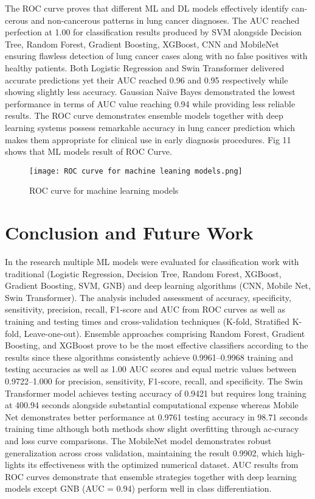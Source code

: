 \documentclass[runningheads]{llncs}
\begin{document}
The ROC curve proves that different ML and DL models effectively identify can-cerous and non-cancerous patterns in lung cancer diagnoses. The AUC reached perfection at 1.00 for classification results produced by SVM alongside Decision Tree, Random Forest, Gradient Boosting, XGBoost, CNN and MobileNet ensuring flawless detection of lung cancer cases along with no false positives with healthy patients. Both Logistic Regression and Swin Transformer delivered accurate predictions yet their AUC reached 0.96 and 0.95 respectively while showing slightly less accuracy. Gaussian Naïve Bayes demonstrated the lowest performance in terms of AUC value reaching 0.94 while providing less reliable results. The ROC curve demonstrates ensemble models together with deep learning systems possess remarkable accuracy in lung cancer prediction which makes them appropriate for clinical use in early diagnosis procedures. Fig 11 shows that ML models result of ROC Curve. 

\begin{figure}
    \centering
    \texttt{[image: ROC curve for machine leaning models.png]}
    \caption{ROC curve for machine learning models}
    \label{fig:enter-label}
\end{figure}


\section{Conclusion and Future Work}

In the research multiple ML models were evaluated for classification work with traditional (Logistic Regression, Decision Tree, Random Forest, XGBoost, Gradient Boosting, SVM, GNB) and deep learning algorithms (CNN, Mobile Net, Swin Transformer). The analysis included assessment of accuracy, specificity, sensitivity, precision, recall, F1-score and AUC from ROC curves as well as training and testing times and cross-validation techniques (K-fold, Stratified K-fold, Leave-one-out). Ensemble approaches comprising Random Forest, Gradient Boosting, and XGBoost prove to be the most effective classifiers according to the results since these algorithms consistently achieve 0.9961–0.9968 training and testing accuracies as well as 1.00 AUC scores and equal metric values between 0.9722–1.000 for precision, sensitivity, F1-score, recall, and specificity. The Swin Transformer model achieves testing accuracy of 0.9421 but requires long training at 400.94 seconds alongside substantial computational expense whereas Mobile Net demonstrates better performance at 0.9761 testing accuracy in 98.71 seconds training time although both methods show slight overfitting through ac-curacy and loss curve comparisons. The MobileNet model demonstrates robust generalization across cross validation, maintaining the result 0.9902, which high-lights its effectiveness with the optimized numerical dataset. AUC results from ROC curves demonstrate that ensemble strategies together with deep learning models except GNB (AUC = 0.94) perform well in class differentiation.
\end{document}
